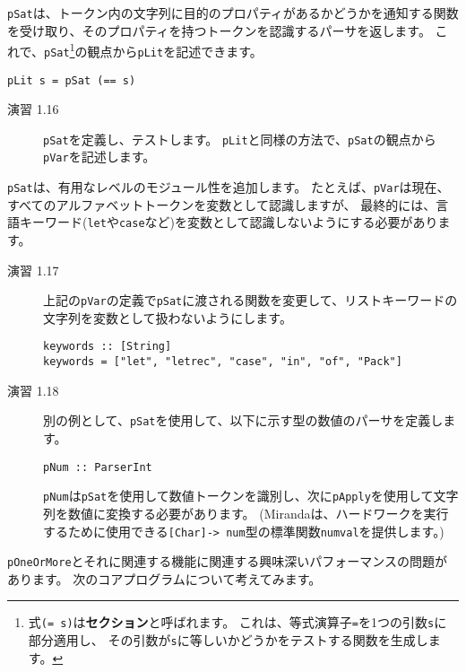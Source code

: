 \documentclass{jarticle}
\begin{document}
\texttt{pSat}は、トークン内の文字列に目的のプロパティがあるかどうかを通知する関数を受け取り、そのプロパティを持つトークンを認識するパーサを返します。
これで、\texttt{pSat}\footnote{式\texttt{(= s)}は\textbf{セクション}と呼ばれます。
	これは、等式演算子\texttt{=}を1つの引数\texttt{s}に部分適用し、
	その引数が\texttt{s}に等しいかどうかをテストする関数を生成します。}の観点から\texttt{pLit}を記述できます。

\begin{verbatim}
pLit s = pSat (== s)
\end{verbatim}

\begin{description}
	\item[演習 1.16] \texttt{pSat}を定義し、テストします。
	      \texttt{pLit}と同様の方法で、\texttt{pSat}の観点から\texttt{pVar}を記述します。
\end{description}

\texttt{pSat}は、有用なレベルのモジュール性を追加します。
たとえば、\texttt{pVar}は現在、すべてのアルファベットトークンを変数として認識しますが、
最終的には、言語キーワード(\texttt{let}や\texttt{case}など)を変数として認識しないようにする必要があります。

\begin{description}
	\item[演習 1.17] 上記の\texttt{pVar}の定義で\texttt{pSat}に渡される関数を変更して、リストキーワードの文字列を変数として扱わないようにします。

	      \begin{verbatim}
keywords :: [String]
keywords = ["let", "letrec", "case", "in", "of", "Pack"]
\end{verbatim}

	\item[演習 1.18] 別の例として、\texttt{pSat}を使用して、以下に示す型の数値のパーサを定義します。

	      \begin{verbatim}
pNum :: ParserInt
\end{verbatim}

	      \texttt{pNum}は\texttt{pSat}を使用して数値トークンを識別し、次に\texttt{pApply}を使用して文字列を数値に変換する必要があります。
	      (Mirandaは、ハードワークを実行するために使用できる\texttt{[Char]-> num}型の標準関数\texttt{numval}を提供します。)
\end{description}

\texttt{pOneOrMore}とそれに関連する機能に関連する興味深いパフォーマンスの問題があります。
次のコアプログラムについて考えてみます。
\end{document}
